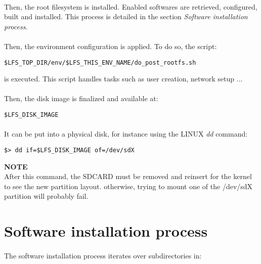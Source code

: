 \documentclass[a4paper, 11pt]{article}
\begin{document}
\paragraph{}
Then, the root filesystem is installed. Enabled softwares are retrieved,
configured, built and installed. This process is detailed in the section
\textit{Software installation process}.

\paragraph{}
Then, the environment configuration is applied. To do so, the script:\\

\begin{lstlisting}[frame=tb]
$LFS_TOP_DIR/env/$LFS_THIS_ENV_NAME/do_post_rootfs.sh
\end{lstlisting}
is executed. This script handles tasks such as user creation, network setup ...

\paragraph{}
Then, the disk image is finalized and available at:\\

\begin{lstlisting}[frame=tb]
$LFS_DISK_IMAGE
\end{lstlisting}

\paragraph{}
It can be put into a physical disk, for instance using the LINUX \textit{dd}
command:\\

\begin{lstlisting}[frame=tb]
$> dd if=$LFS_DISK_IMAGE of=/dev/sdX
\end{lstlisting}
\textbf{NOTE}\\
After this command, the SDCARD must be removed and reinsert for the kernel to
see the new partition layout. otherwise, trying to mount one of the /dev/sdX
partition will probably fail.


\clearpage
\section{Software installation process}
\paragraph{}
The software installation process iterates over subdirectories in:\\
\end{document}
